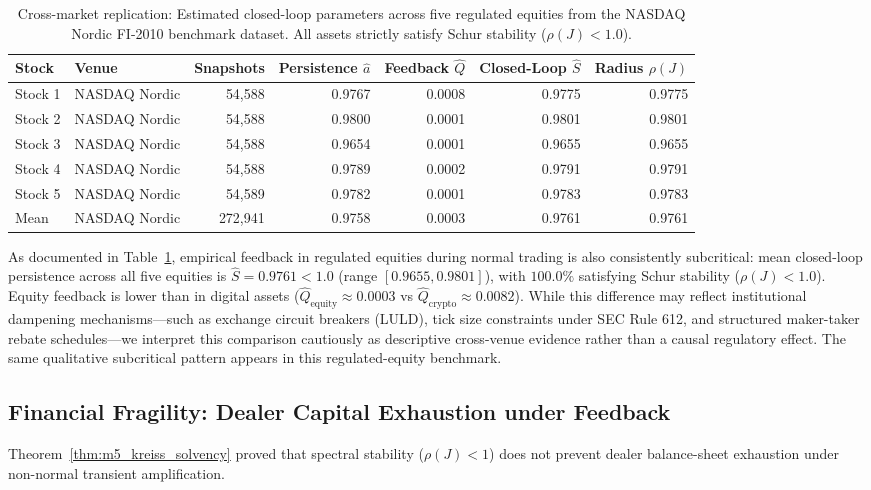 \documentclass[12pt]{article}
\theoremstyle{definition}
\theoremstyle{remark}
\begin{document}
\begin{table}[htbp]
\centering\footnotesize
\setlength{\tabcolsep}{4pt}
\caption{Cross-market replication: Estimated closed-loop parameters across five regulated equities from the NASDAQ Nordic FI-2010 benchmark dataset. All assets strictly satisfy Schur stability ($\rho(J) < 1.0$).}
\label{tab:equity_benchmark}
\begin{tabular}{llrrrrr}\toprule
Stock & Venue & Snapshots & Persistence $\hat{a}$ & Feedback $\hat{Q}$ & Closed-Loop $\hat{S}$ & Radius $\rho(J)$ \\\midrule
Stock 1 & NASDAQ Nordic & 54,588 & 0.9767 & 0.0008 & 0.9775 & 0.9775 \\
Stock 2 & NASDAQ Nordic & 54,588 & 0.9800 & 0.0001 & 0.9801 & 0.9801 \\
Stock 3 & NASDAQ Nordic & 54,588 & 0.9654 & 0.0001 & 0.9655 & 0.9655 \\
Stock 4 & NASDAQ Nordic & 54,588 & 0.9789 & 0.0002 & 0.9791 & 0.9791 \\
Stock 5 & NASDAQ Nordic & 54,589 & 0.9782 & 0.0001 & 0.9783 & 0.9783 \\\midrule
Mean & NASDAQ Nordic & 272,941 & 0.9758 & 0.0003 & 0.9761 & 0.9761 \\\bottomrule
\end{tabular}
\end{table}

As documented in Table~\ref{tab:equity_benchmark}, empirical feedback in regulated equities during normal trading is also consistently subcritical: mean closed-loop persistence across all five equities is $\hat{S} = 0.9761 < 1.0$ (range $[0.9655, 0.9801]$), with $100.0\%$ satisfying Schur stability ($\rho(J) < 1.0$). Equity feedback is lower than in digital assets ($\hat{Q}_{\text{equity}} \approx 0.0003$ vs $\hat{Q}_{\text{crypto}} \approx 0.0082$). While this difference may reflect institutional dampening mechanisms—such as exchange circuit breakers (LULD), tick size constraints under SEC Rule 612, and structured maker-taker rebate schedules—we interpret this comparison cautiously as descriptive cross-venue evidence rather than a causal regulatory effect. The same qualitative subcritical pattern appears in this regulated-equity benchmark.

\subsection{Financial Fragility: Dealer Capital Exhaustion under Feedback}
\label{sec:dealer_solvency}
Theorem~\ref{thm:m5_kreiss_solvency} proved that spectral stability ($\rho(J) < 1$) does not prevent dealer balance-sheet exhaustion under non-normal transient amplification.
\end{document}

